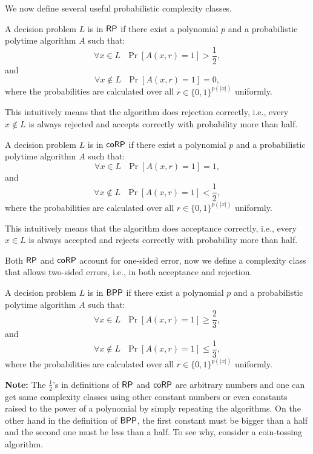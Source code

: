 We now define several useful probabilistic complexity classes.

\begin{definition} \label{rpdef}
A decision problem $L$ is in $\mathsf{RP}$ if there exist a polynomial $p$ and a probabilistic polytime algorithm $A$ such that:
$$\forall x \in L ~~~ \Pr[A(x, r) = 1] > \frac{1}{2},$$ and $$\forall x \not \in L ~~~ \Pr[A(x, r) = 1] = 0,$$
where the probabilities are calculated over all $r \in \{0, 1\}^{p(\vert x \vert)}$ uniformly.

This intuitively means that the algorithm does rejection correctly, i.e., every $x \not \in L$ is always rejected and accepts correctly with probability more than half.
\end{definition}

\begin{definition}[$\cc{coRP}$] 
A decision problem $L$ is in $\cc{coRP}$ if there exist a polynomial $p$ and a probabilistic polytime algorithm $A$ such that:
$$\forall x \in L ~~~ \Pr[A(x, r) = 1] = 1,$$ and $$\forall x \not \in L ~~~ \Pr[A(x, r) = 1] < \frac{1}{2},$$
where the probabilities are calculated over all $r \in \{0, 1\}^{p(\vert x \vert)}$ uniformly.

This intuitively means that the algorithm does acceptance correctly, i.e., every $x \in L$ is always accepted and rejects correctly with probability more than half.
\end{definition}

Both $\mathsf{RP}$ and $\cc{coRP}$ account for one-sided error, now we define a complexity class that allows two-sided errors, i.e., in both acceptance and rejection.

\begin{definition} 
A decision problem $L$ is in $\mathsf{BPP}$ if there exist a polynomial $p$ and a probabilistic polytime algorithm $A$ such that:
$$\forall x \in L ~~~ \Pr[A(x, r) = 1] \geq \frac{2}{3},$$ and $$\forall x \not \in L ~~~ \Pr[A(x, r) = 1] \leq \frac{1}{3},$$
where the probabilities are calculated over all $r \in \{0, 1\}^{p(\vert x \vert)}$ uniformly.
\end{definition}

\textbf{Note:} The $\frac{1}{2}$'s in definitions of $\mathsf{RP}$ and $\cc{coRP}$ are arbitrary numbers and one can get same complexity classes using other constant numbers or even constants raised to the power of a polynomial by simply repeating the algorithms. On the other hand in the definition of $\mathsf{BPP}$, the first constant must be bigger than a half and the second one must be less than a half. To see why, consider a coin-tossing algorithm.

